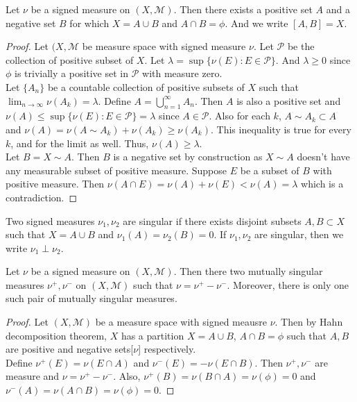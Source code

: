 \begin{theorem}
	Let $\nu$ be a signed measure on $(X,\mathcal{M})$.
	Then there exists a positive set $A$ and a negative set $B$ for which $ X = A \cup B$ and $A \cap B = \phi$.
	And we write $[A,B] = X$.
\end{theorem}
\begin{proof}
	Let $(X,\mathcal{M}$ be measure space with signed measure $\nu$.
	Let $\mathcal{P}$ be the collection of positive subset of $X$.
	Let $\lambda = \sup \{ \nu(E) : E \in \mathcal{P}\}$.
	And $\lambda \ge 0$ since $\phi$ is trivially a positive set in $\mathcal{P}$ with measure zero.\\

	Let $\{ A_n \}$ be a countable collection of positive subsets of $X$ such that $\displaystyle \lim_{n \to \infty} \nu(A_k) = \lambda$.
	Define $\displaystyle A = \bigcup_{n=1}^\infty A_n$.
	Then $A$ is also a positive set and $\nu(A) \le \sup \{ \nu(E) : E \in \mathcal{P}\} = \lambda$ since $A \in \mathcal{P}$.
	Also for each $k$, $A \sim A_k \subset A$ and $\nu(A) = \nu(A \sim A_k) + \nu(A_k) \ge \nu(A_k)$.
	This inequality is true for every $k$, and for the limit as well.
	Thus, $\nu(A) \ge \lambda$.\\

	Let $B = X \sim A$.
	Then $B$ is a negative set by construction as $X \sim A$ doesn't have any measurable subset of positive measure.
	Suppose $E$ be a subset of $B$ with positive measure.
	Then $\nu(A \cap E) = \nu(A) + \nu(E) < \nu(A) = \lambda$ which is a contradiction.
\end{proof}

\begin{definition}
	Two signed measures $\nu_1,\nu_2$ are singular if there exists disjoint subsets $A,B \subset X$ such that $X = A \cup B$ and $\nu_1(A) = \nu_2(B) = 0$.
	If $\nu_1,\nu_2$ are singular, then we write $\nu_1 \perp \nu_2$.
\end{definition}

\begin{theorem}
	Let $\nu$ be a signed measure on $(X,\mathcal{M})$.
	Then there two mutually singular measures $\nu^+,\nu^-$ on $(X,\mathcal{M})$ such that $\nu = \nu^+ - \nu^-$.
	Moreover, there is only one such pair of mutually singular measures.
\end{theorem}
\begin{proof}
	Let $(X,\mathcal{M})$ be a measure space with signed meausre $\nu$.
	Then by Hahn decomposition theorem, $X$ has a partition $X = A \cup B$, $A \cap B = \phi$ such that $A,B$ are positive and negative sets[$\nu$] respectively.\\

	Define $\nu^+(E) = \nu(E \cap A)$ and $\nu^-(E) = -\nu(E \cap B)$.
	Then $\nu^+,\nu^-$ are measure and $\nu = \nu^+ - \nu^-$.
	Also, $\nu^+(B) = \nu(B \cap A) = \nu(\phi) = 0$ and $\nu^-(A) = \nu(A \cap B) = \nu(\phi) = 0$.
\end{proof}


